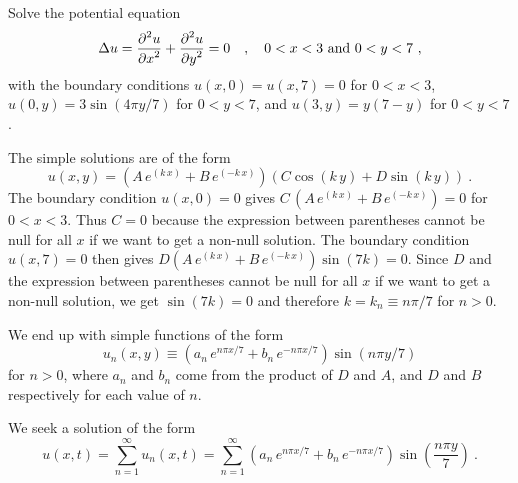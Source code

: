 \begin{egg}
Solve the potential equation
\[
\Delta u = \frac{\displaystyle \partial^{2}{u}} {\displaystyle \partial x^{2}} + \frac{\displaystyle \partial^{2}{u}} {\displaystyle \partial y^{2}} = 0 \quad ,
\quad 0<x<3 \ \text{and} \ 0<y<7 \ ,
\]
with the boundary conditions
$u(x,0) = u(x,7) = 0$ for $0<x<3$, $u(0,y) = 3\sin\left(4\pi y/7\right)$
for $0<y<7$, and $u(3,y) = y(7-y)$ for $0<y<7$.

The simple solutions are of the form
\[
u(x,y) = (A\,e^{(k\,x)} + B\,e^{(-k\,x)})(C \cos(k\,y) + D \sin(k\,y)) \ .
\]
The boundary condition $u(x,0) =0$ gives
$C\,(A\,e^{(k\,x)} + B\,e^{(-k\,x)})=0$ for $0<x<3$.  Thus $C=0$ because the
expression between parentheses cannot be null for all $x$ if we want
to get a non-null solution.  The boundary condition $u(x,7) = 0$ then
gives $D (A\,e^{(k\,x)} + B\,e^{(-k\,x)})\sin(7k) = 0$.  Since $D$ and
the expression between parentheses cannot be null for all $x$ if we
want to get a non-null solution, we get $\sin(7k) = 0$ and therefore
$k=k_n \equiv n\pi/7$ for $n >0$.

We end up with simple functions of the form
\[
u_n(x,y) \equiv \left(a_n\,e^{n\pi x/7} + b_n\,e^{-n\pi x/7}\right)\sin(n\pi y/7)
\]
for $n > 0$, where $a_n$ and $b_n$ come from the product of $D$ and
$A$, and $D$ and $B$ respectively for each value of $n$.

We seek a solution of the form
\[
u(x,t) = \sum_{n=1}^\infty u_n(x,t)
= \sum_{n=1}^\infty \left(a_n\,e^{n\pi x/7}
+ b_n\,e^{-n\pi x/7}\right)\sin\left(\frac{n\pi y}{7}\right) \ .
\]


\end{egg}
